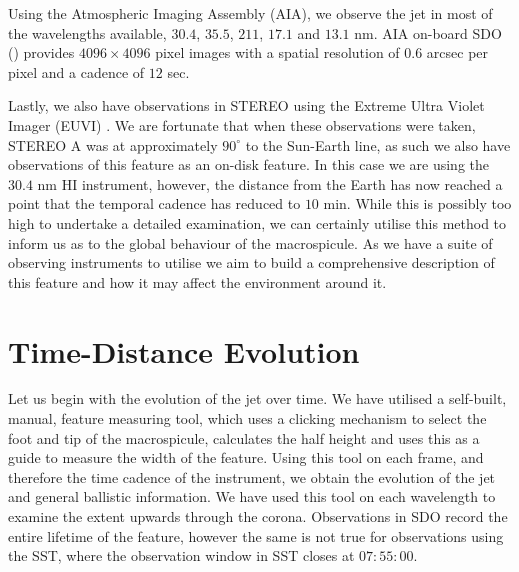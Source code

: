 Using the Atmospheric Imaging Assembly (AIA), we observe the jet in most of the wavelengths available, $30.4$, $35.5$, $211$, $17.1$ and $13.1$ nm.
AIA on-board SDO (\cite{AIAspec}) provides $4096 \times 4096$ pixel images with a spatial resolution of $0.6$ arcsec per pixel and a cadence of $12$ sec.

Lastly, we also have observations in STEREO using the Extreme Ultra Violet Imager (EUVI) \cite{Defise2001}. 
We are fortunate that when these observations were taken, STEREO A was at approximately $90^\circ$ to the Sun-Earth line, as such we also have observations of this feature as an on-disk feature.
In this case we are using the $30.4$ nm HI instrument, however, the distance from the Earth has now reached a point that the temporal cadence has reduced to $10$ min.
While this is possibly too high to undertake a detailed examination, we can certainly utilise this method to inform us as to the global behaviour of the macrospicule.
As we have a suite of observing instruments to utilise we aim to build a comprehensive description of this feature and how it may affect the environment around it.


\section{Time-Distance Evolution}
\label{sec:time_dist_sect}

Let us begin with the evolution of the jet over time. 
We have utilised a self-built, manual, feature measuring tool, which uses a clicking mechanism to select the foot and tip of the macrospicule, calculates the half height and uses this as a guide to measure the width of the feature.
Using this tool on each frame, and therefore the time cadence of the instrument, we obtain the evolution of the jet and general ballistic information.
We have used this tool on each wavelength to examine the extent upwards through the corona. 
Observations in SDO record the entire lifetime of the feature, however the same is not true for observations using the SST, where the observation window in SST closes at $07:55:00$.

